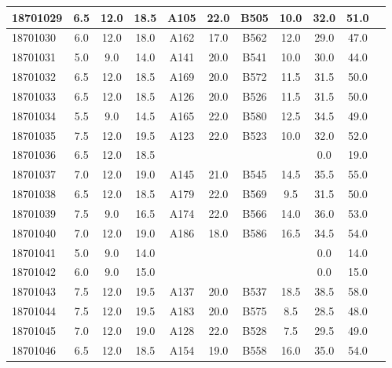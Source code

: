 \documentclass[12pt]{article}
\begin{document}
\begin{center}
\begin{small}
\begin{tabular}{|l|c|c|c|c|c|c|c|c|c|c|}
18701029 & 6.5 & 12.0 & 18.5 & A105 & 22.0 & B505 & 10.0 & 32.0 & 51.0\\ \hline 
18701030 & 6.0 & 12.0 & 18.0 & A162 & 17.0 & B562 & 12.0 & 29.0 & 47.0\\ \hline 
18701031 & 5.0 & 9.0 & 14.0 & A141 & 20.0 & B541 & 10.0 & 30.0 & 44.0\\ \hline 
18701032 & 6.5 & 12.0 & 18.5 & A169 & 20.0 & B572 & 11.5 & 31.5 & 50.0\\ \hline 
18701033 & 6.5 & 12.0 & 18.5 & A126 & 20.0 & B526 & 11.5 & 31.5 & 50.0\\ \hline 
18701034 & 5.5 & 9.0 & 14.5 & A165 & 22.0 & B580 & 12.5 & 34.5 & 49.0\\ \hline 
18701035 & 7.5 & 12.0 & 19.5 & A123 & 22.0 & B523 & 10.0 & 32.0 & 52.0\\ \hline 
18701036 & 6.5 & 12.0 & 18.5 &  &  &  &  & 0.0 & 19.0\\ \hline 
18701037 & 7.0 & 12.0 & 19.0 & A145 & 21.0 & B545 & 14.5 & 35.5 & 55.0\\ \hline 
18701038 & 6.5 & 12.0 & 18.5 & A179 & 22.0 & B569 & 9.5 & 31.5 & 50.0\\ \hline 
18701039 & 7.5 & 9.0 & 16.5 & A174 & 22.0 & B566 & 14.0 & 36.0 & 53.0\\ \hline 
18701040 & 7.0 & 12.0 & 19.0 & A186 & 18.0 & B586 & 16.5 & 34.5 & 54.0\\ \hline 
18701041 & 5.0 & 9.0 & 14.0 &  &  &  &  & 0.0 & 14.0\\ \hline 
18701042 & 6.0 & 9.0 & 15.0 &  &  &  &  & 0.0 & 15.0\\ \hline 
18701043 & 7.5 & 12.0 & 19.5 & A137 & 20.0 & B537 & 18.5 & 38.5 & 58.0\\ \hline 
18701044 & 7.5 & 12.0 & 19.5 & A183 & 20.0 & B575 & 8.5 & 28.5 & 48.0\\ \hline 
18701045 & 7.0 & 12.0 & 19.0 & A128 & 22.0 & B528 & 7.5 & 29.5 & 49.0\\ \hline 
18701046 & 6.5 & 12.0 & 18.5 & A154 & 19.0 & B558 & 16.0 & 35.0 & 54.0\\ \hline 
        \end{tabular}
            \end{small}
            \end{center}
  \centering
            
\end{document}
